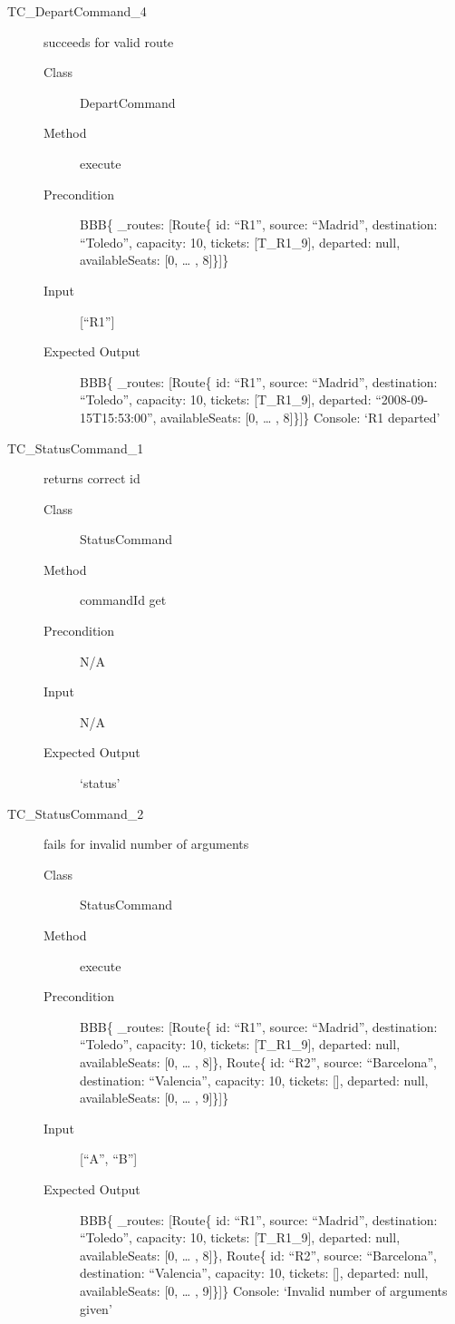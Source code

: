 \documentclass[11pt]{article}
\begin{document}
\begin{description}
\item[{TC\_DepartCommand\_4}] succeeds for valid route
\begin{description}
\item[{Class}] DepartCommand
\item[{Method}] execute
\item[{Precondition}] BBB\{ \_routes: [Route\{ id: “R1”, source: “Madrid”, destination: “Toledo”, capacity: 10,  tickets: [T\_R1\_9], departed: null, availableSeats: [0, … , 8]\}]\}
\item[{Input}] [“R1”]
\item[{Expected Output}] BBB\{ \_routes: [Route\{ id: “R1”, source: “Madrid”, destination: “Toledo”, capacity: 10,  tickets: [T\_R1\_9], departed: “2008-09-15T15:53:00”, availableSeats: [0, … , 8]\}]\}
Console: ‘R1 departed’
\end{description}

\item[{TC\_StatusCommand\_1}] returns correct id
\begin{description}
\item[{Class}] StatusCommand
\item[{Method}] commandId get
\item[{Precondition}] N/A
\item[{Input}] N/A
\item[{Expected Output}] ‘status’
\end{description}

\item[{TC\_StatusCommand\_2}] fails for invalid number of arguments
\begin{description}
\item[{Class}] StatusCommand
\item[{Method}] execute
\item[{Precondition}] BBB\{ \_routes: [Route\{ id: “R1”, source: “Madrid”, destination: “Toledo”, capacity: 10,  tickets: [T\_R1\_9], departed: null, availableSeats: [0, … , 8]\}, Route\{ id: “R2”, source: “Barcelona”, destination: “Valencia”, capacity: 10,  tickets: [], departed: null, availableSeats: [0, … , 9]\}]\}
\item[{Input}] [“A”, “B”]
\item[{Expected Output}] BBB\{ \_routes: [Route\{ id: “R1”, source: “Madrid”, destination: “Toledo”, capacity: 10,  tickets: [T\_R1\_9], departed: null, availableSeats: [0, … , 8]\}, Route\{ id: “R2”, source: “Barcelona”, destination: “Valencia”, capacity: 10,  tickets: [], departed: null, availableSeats: [0, … , 9]\}]\}
Console: ‘Invalid number of arguments given’
\end{description}


\end{description}
\end{document}
